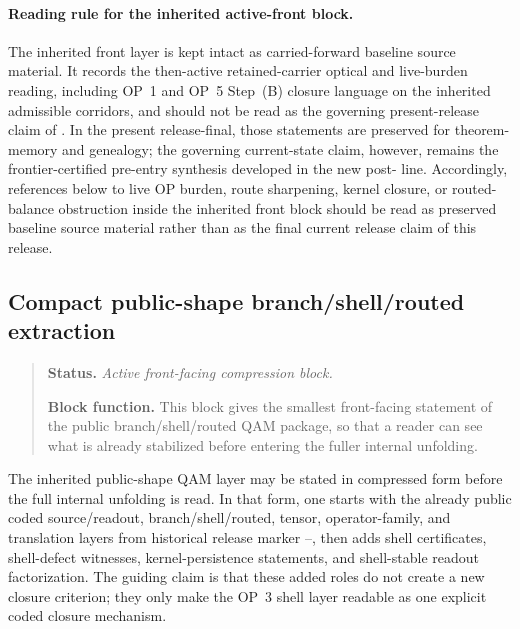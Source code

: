 \paragraph{Reading rule for the inherited active-front block.}
The inherited  front layer is kept intact as carried-forward baseline source material. It records the then-active retained-carrier optical and live-burden reading, including OP~1 and OP~5 Step~(B) closure language on the inherited admissible corridors, and should not be read as the governing present-release claim of \docversion. In the present release-final, those statements are preserved for theorem-memory and genealogy; the governing current-state claim, however, remains the frontier-certified pre-entry synthesis developed in the new post- line. Accordingly, references below to live OP burden, route sharpening, kernel closure, or routed-balance obstruction inside the inherited front block should be read as preserved baseline source material rather than as the final current release claim of this release.

\subsection*{Compact public-shape branch/shell/routed extraction}
\begin{quote}\small
\noindent\textbf{Status.} \emph{Active front-facing compression block.}\par
\noindent\textbf{Block function.} This block gives the smallest front-facing statement of the public branch/shell/routed QAM package, so that a reader can see what is already stabilized before entering the fuller internal unfolding.
\end{quote}
The inherited public-shape QAM layer may be stated in compressed form before the full internal unfolding is read. In that form, one starts with the already public coded source/readout, branch/shell/routed, tensor, operator-family, and translation layers from historical release marker --, then adds shell certificates, shell-defect witnesses, kernel-persistence statements, and shell-stable readout factorization. The guiding claim is that these added roles do not create a new closure criterion; they only make the OP~3 shell layer readable as one explicit coded closure mechanism.

